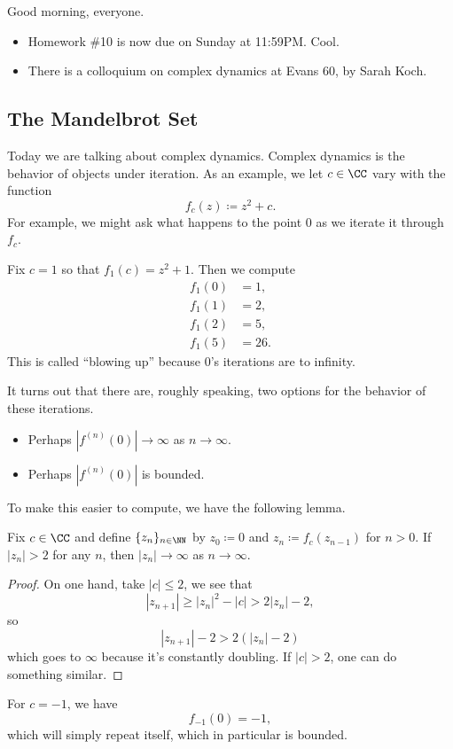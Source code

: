 
Good morning, everyone.
\begin{itemize}
	\item Homework \#10 is now due on Sunday at 11:59PM. Cool.
	\item There is a colloquium on complex dynamics at Evans 60, by Sarah Koch.
\end{itemize}

\subsection{The Mandelbrot Set}
Today we are talking about complex dynamics. Complex dynamics is the behavior of objects under iteration. As an example, we let $c\in\CC$ vary with the function
\[f_c(z)\coloneqq z^2+c.\]
For example, we might ask what happens to the point $0$ as we iterate it through $f_c$.
\begin{example}
	Fix $c=1$ so that $f_1(c)=z^2+1$. Then we compute
	\begin{align*}
		f_1(0) &= 1, \\
		f_1(1) &= 2, \\
		f_1(2) &= 5, \\
		f_1(5) &= 26.
	\end{align*}
	This is called ``blowing up'' because $0$'s iterations are to infinity.
\end{example}
It turns out that there are, roughly speaking, two options for the behavior of these iterations.
\begin{itemize}
	\item Perhaps $\left|f^{(n)}(0)\right|\to\infty$ as $n\to\infty$.
	\item Perhaps $\left|f^{(n)}(0)\right|$ is bounded.
\end{itemize}
To make this easier to compute, we have the following lemma.
\begin{lemma}
	Fix $c\in\CC$ and define $\{z_n\}_{n\in\NN}$ by $z_0\coloneqq0$ and $z_n\coloneqq f_c(z_{n-1})$ for $n>0$. If $|z_n|>2$ for any $n$, then $|z_n|\to\infty$ as $n\to\infty$.
\end{lemma}
\begin{proof}
	On one hand, take $|c|\le2$, we see that
	\[|z_{n+1}|\ge|z_n|^2-|c|>2|z_n|-2,\]
	so
	\[|z_{n+1}|-2>2(|z_n|-2)\]
	which goes to $\infty$ because it's constantly doubling. If $|c|>2$, one can do something similar.
\end{proof}
\begin{example}
	For $c=-1$, we have
	\[f_{-1}(0)=-1,\]
	which will simply repeat itself, which in particular is bounded.
\end{example}
